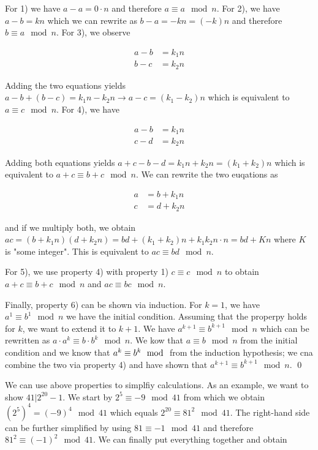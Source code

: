 For 1) we have $a - a = 0 \cdot n$ and therefore $a \equiv a \mod n$. For 2), we have $a - b = kn$ which we can rewrite as $b - a = -kn = (-k)n$ and therefore $b \equiv a \mod n$. For 3), we observe 

\begin{align}
    a - b &= k_1 n \\
    b - c &= k_2 n
\end{align}

Adding the two equations yields $a - b + (b - c) = k_1 n - k_2 n \rightarrow a - c = (k_1-k_2)n$ which is equivalent to $a \equiv c \mod n$. For 4), we have

\begin{align}
    a - b &= k_1 n \\
    c - d &= k_2 n
\end{align}

Adding both equations yields $a + c - b - d = k_1 n + k_2 n = (k_1 + k_2)n$ which is equivalent to $a+c \equiv b+c \mod n$. We can rewrite the two euqations as

\begin{align}
    a &= b + k_1 n \\
    c &= d + k_2 n
\end{align}

and if we multiply both, we obtain $ac = (b + k_1 n)(d + k_2 n) =bd  + (k_1 + k_2)n + k_1 k_2 n \cdot n = bd + K n$ where $K$ is "some integer". This is equivalent to $ac \equiv bd \mod n$.

For 5), we use property 4) with property 1) $c \equiv c \mod n$ to obtain $a + c \equiv b + c \mod n$ and $ac \equiv bc \mod n$.

Finally, property 6) can be shown via induction. For $k = 1$, we have $a^1 \equiv b^1 \mod n$ we have the initial condition. Assuming that the properpy holds for $k$, we want to extend it to $k+1$. We have $a^{k+1} \equiv b^{k+1} \mod n$ which can be rewritten as $a \cdot a^k \equiv b \cdot b^k \mod n$. We kow that $a \equiv b \mod n$ from the initial condition and we know that $a^k \equiv b^k \mod$ from the induction hypothesis; we cna combine the two via property 4) and have shown that $a^{k+1} \equiv b^{k+1} \mod n$. \qed


We can use above properties to simplfiy calculations. As an example, we want to show $41 | 2^{20} - 1$. We start by $2^5 \equiv -9 \mod 41$ from which we obtain $(2^5)^4 = (-9)^4 \mod 41$ which equals $2^{20} \equiv 81^2 \mod 41$. The right-hand side can be further simplified by using $81 \equiv -1 \mod 41$ and therefore $81^2 \equiv (-1)^2 \mod 41$. We can finally put everything together and obtain

